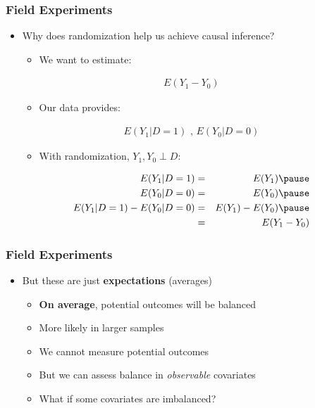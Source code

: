 \documentclass[xcolor=x11names,compress]{beamer}\usepackage[]{graphicx}\usepackage[]{xcolor}
\renewcommand{\(}{\begin{columns}}
\renewcommand{\)}{\end{columns}}
\newcommand{\<}[1]{\begin{column}{#1}}
\renewcommand{\>}{\end{column}}
\begin{document}
\begin{frame}
\frametitle{Field Experiments}
\begin{itemize}
\item Why does randomization help us achieve causal inference?
\begin{itemize}
\item We want to estimate:
\end{itemize}
\begin{eqnarray}
E(Y_1 - Y_0)
\end{eqnarray}
\pause
\begin{itemize}
\item Our data provides:
\end{itemize}
\begin{eqnarray}
E(Y_1|D=1)\text{ ,  }E(Y_0|D=0)
\end{eqnarray}
\pause
\begin{itemize}
\item With randomization, $Y_1, Y_0 \perp D$:
\pause
\end{itemize}
\begin{eqnarray}
E(Y_1|D=1) &=& E(Y_1) \pause \\
E(Y_0|D=0) &=& E(Y_0) \pause \\
E(Y_1|D=1) - E(Y_0|D=0) &=& E(Y_1) - E(Y_0) \pause \\
&=& E(Y_1 - Y_0)
\end{eqnarray}
\end{itemize}
\end{frame}

\begin{frame}
\frametitle{Field Experiments}
\begin{itemize}
\item But these are just \textbf{expectations} (averages)
\pause
\begin{itemize}
\item \textbf{On average}, potential outcomes will be balanced
\pause
\item More likely in larger samples
\pause
\item We cannot measure potential outcomes
\pause
\item But we can assess balance in \textit{observable} covariates
\pause
\item What if some covariates are imbalanced? %
\end{itemize}
\end{itemize}
\end{frame}
\end{document}
